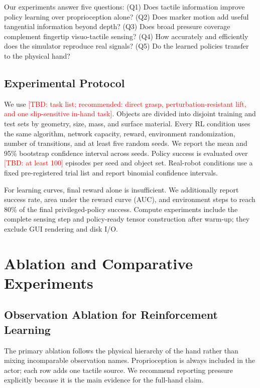 \documentclass[10pt,twocolumn]{article}
\newcommand{\TBD}[1]{\textcolor{red}{[TBD: #1]}}
\begin{document}
Our experiments answer five questions: (Q1) Does tactile information improve
policy learning over proprioception alone? (Q2) Does marker motion add useful
tangential information beyond depth? (Q3) Does broad pressure coverage
complement fingertip visuo-tactile sensing? (Q4) How accurately and efficiently
does the simulator reproduce real signals? (Q5) Do the learned policies transfer
to the physical hand?

\subsection{Experimental Protocol}

We use \TBD{task list; recommended: direct grasp, perturbation-resistant lift,
and one slip-sensitive in-hand task}.  Objects are divided into disjoint
training and test sets by geometry, size, mass, and surface material.  Every RL
condition uses the same algorithm, network capacity, reward, environment
randomization, number of transitions, and at least five random seeds.  We report
the mean and 95\% bootstrap confidence interval across seeds.  Policy success is
evaluated over \TBD{at least 100} episodes per seed and object set.  Real-robot
conditions use a fixed pre-registered trial list and report binomial confidence
intervals.

For learning curves, final reward alone is insufficient.  We additionally
report success rate, area under the reward curve (AUC), and environment steps to
reach 80\% of the final privileged-policy success.  Compute experiments include
the complete sensing step and policy-ready tensor construction after warm-up;
they exclude GUI rendering and disk I/O.

\section{Ablation and Comparative Experiments}
\label{sec:ablation}

\subsection{Observation Ablation for Reinforcement Learning}

The primary ablation follows the physical hierarchy of the hand rather than
mixing incomparable observation names.  Proprioception is always included in
the actor; each row adds one tactile source.  We recommend reporting pressure
explicitly because it is the main evidence for the full-hand claim.
\end{document}
